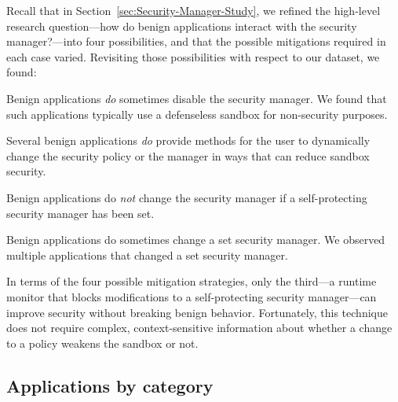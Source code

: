 \documentclass{sig-alternate-05-2015}
\begin{document}
Recall that in Section~\ref{sec:Security-Manager-Study}, we refined the
high-level research question---how do benign applications interact with the
security manager?---into four possibilities, and that the possible mitigations
required in each case varied.  Revisiting those
possibilities with respect to our dataset, we found:
\begin{flushenum}\setlength{\parskip}{0pt}
  \setlength{\parsep}{0pt}
  \setlength{\itemsep}{0pt}
\item Benign applications \emph{do} sometimes disable the security manager.
  We found that such applications typically use a defenseless sandbox for
  non-security purposes.

\item Several benign applications \emph{do} provide methods for the user to
  dynamically change the security policy or the manager in ways that can reduce
  sandbox security.

\item Benign applications do \emph{not} change the
security manager if a self-protecting security manager has been set.  

\item Benign applications do sometimes change a set security manager.  We
  observed multiple applications that changed a set security manager.
\end{flushenum}

In terms of the four possible mitigation strategies,
only the third---a runtime monitor that blocks modifications to a self-protecting security manager---can
improve security without breaking benign behavior. 
Fortunately, this technique does not require complex, context-sensitive
information about whether a change to a policy weakens the sandbox or not. 

% 

\subsection{Applications by category}
\end{document}
